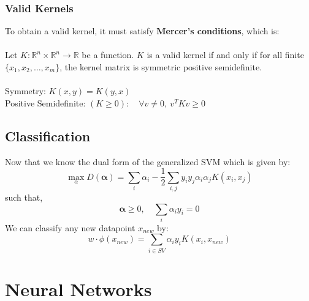 \documentclass[12pt, a4paper]{book}
\begin{document}
\subsection{Valid Kernels}
To obtain a valid kernel, it must satisfy \textbf{Mercer's conditions}, which is:\\\\
Let $K: \mathbb{R}^n\times\mathbb{R}^n \to \mathbb{R}$ be a function. $K$ is a valid kernel if and only if for all finite $\{x_1,x_2,\ldots,x_m\}$, the kernel matrix is symmetric positive semidefinite.\\\\
Symmetry: $K (x, y) = K (y, x)$\\
Positive Semidefinite: $(K \geq 0): \quad \forall v \neq 0, \ v^TKv \geq 0$

\section{Classification}
Now that we know the dual form of the generalized SVM which is given by:
$$\max_{\alpha}D(\boldsymbol{\alpha}) = \sum_i\alpha_i -\frac{1}{2} \sum_{i,j}y_iy_j\alpha_i\alpha_jK(x_i,x_j)$$
such that,
$$\boldsymbol{\alpha} \geq 0, \quad \sum_i\alpha_iy_i = 0$$
We can classify any new datapoint $x_{new}$ by:
$$w\cdot\phi(x_{new}) = \sum_{i\in SV}\alpha_iy_iK(x_i,x_{new})$$



\chapter{Neural Networks}
\end{document}
